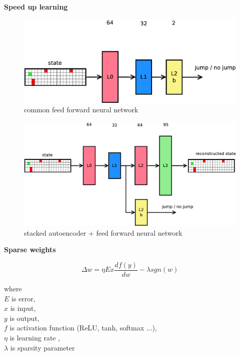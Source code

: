 \documentclass[xcolor=dvipsnames]{beamer}
\begin{document}
\begin{frame}{\bf Speed up learning}

\begin{figure}[htbp]
  \centering
  \includegraphics[scale=0.21]{../../diagrams/fnn.png}
  \caption*{common feed forward neural network}
\end{figure}

\begin{figure}[htbp]
  \centering
  \includegraphics[scale=0.21]{../../diagrams/hnn.png}
  \caption*{stacked autoencoder + feed forward neural network}
\end{figure}

\end{frame}


\begin{frame}{\bf Sparse weights}

\begin{equation*}
  \label{eq:weights_training}
  \Delta w = \eta E x \frac{df(y)}{dw} - \lambda sgn(w)
\end{equation*}

where \\
$E$ is error, \\
$x$ is input, \\
$y$ is output, \\
$f$ is activation function (ReLU, tanh, softmax ...), \\
$\eta$ is learning rate , \\
$\lambda$ is sparsity parameter

\end{frame}
\end{document}
